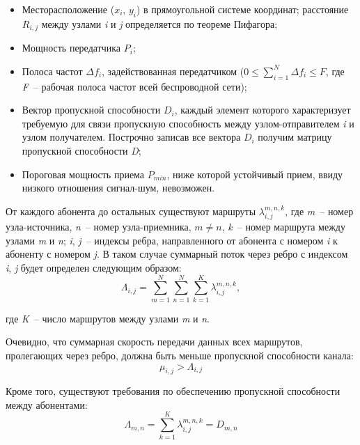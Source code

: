 \documentclass[14pt,a4paper,titlepage]{extarticle}
\begin{document}
\begin{itemize}
	\item Месторасположение ($x_i$, $y_i$) в прямоугольной системе координат; расстояние $R_{i, j}$ между узлами \textit{i} и \textit{j} определяется по теореме Пифагора;
	\item Мощность передатчика $P_i$;
	\item Полоса частот $\Delta f_i$, задействованная передатчиком ($0 \leq  \sum\limits_{i=1}^N \Delta f_i \leq F$, где \textit{F}~-- рабочая полоса частот всей беспроводной сети);
	\item Вектор пропускной способности $D_i$, каждый элемент которого характеризует требуемую для связи пропускную способность между узлом-отправителем \textit{i} и узлом получателем. Построчно записав все вектора $D_i$ получим матрицу пропускной способности \textit{D};
	\item Пороговая мощность приема $P_{min}$, ниже которой устойчивый прием, ввиду низкого отношения сигнал-шум, невозможен.
\end{itemize}

От каждого абонента до остальных существуют маршруты $\lambda_{i,j}^{m,n,k}$, где \textit{m}~-- номер узла-источника, \textit{n}~-- номер узла-приемника, $m \neq n$, \textit{k}~-- номер маршрута между узлами \textit{m} и \textit{n}; \textit{i}, \textit{j}~-- индексы ребра, направленного от абонента с номером \textit{i} к абоненту с номером \textit{j}. В таком случае суммарный поток через ребро с индексом \textit{i}, \textit{j} будет определен следующим образом:
\begin{equation}
\Lambda_{i,j} = \sum\limits_{m=1}^N\sum\limits_{n=1}^N\sum\limits_{k=1}^K\lambda_{i,j}^{m,n,k} ,
\end{equation}

где \textit{K}~-- число маршрутов между узлами \textit{m} и \textit{n}.

Очевидно, что суммарная скорость передачи данных всех маршрутов, пролегающих через ребро, должна быть меньше пропускной способности канала:
\begin{equation}
\label{eq:mu_greater_lambda}
\mu_{i,j} > \Lambda_{i,j}
\end{equation}

Кроме того, существуют требования по обеспечению пропускной способности между абонентами:
\begin{equation}
\label{eq:lambda_equals_datarate}
\Lambda_{m,n} = \sum\limits_{k=1}^K\lambda_{i,j}^{m,n,k} = D_{m,n}
\end{equation}
\end{document}
